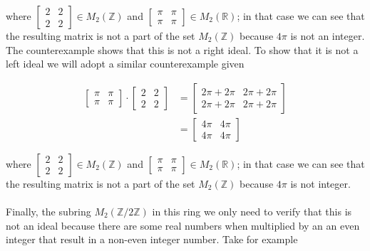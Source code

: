 \documentclass{article}
\begin{document}
        \noindent where $\begin{bmatrix}2 & 2 \\ 2 & 2\end{bmatrix} \in M_2(\mathbb{Z})$ and $\begin{bmatrix}\pi & \pi \\ \pi & \pi\end{bmatrix} \in M_2(\mathbb{R})$; in that case we can see that the resulting matrix is not a part of the set $M_2(\mathbb{Z})$ because $4\pi$ is not an integer. The counterexample shows that this is not a right ideal. To show that it is not a left ideal we will adopt a similar counterexample given

          \[
            \begin{split}
              \begin{bmatrix}\pi & \pi \\ \pi & \pi\end{bmatrix} \cdot \begin{bmatrix}2 & 2 \\ 2 & 2\end{bmatrix}  &= \begin{bmatrix}2\pi + 2\pi & 2\pi + 2\pi \\ 2\pi + 2\pi & 2\pi + 2\pi\end{bmatrix}\\
              &= \begin{bmatrix}4\pi & 4\pi \\ 4\pi & 4\pi \end{bmatrix}
            \end{split}
          \]

        \noindent where $\begin{bmatrix}2 & 2 \\ 2 & 2\end{bmatrix} \in M_2(\mathbb{Z})$ and $\begin{bmatrix}\pi & \pi \\ \pi & \pi\end{bmatrix} \in M_2(\mathbb{R})$; in that case we can see that the resulting matrix is not a part of the set $M_2(\mathbb{Z})$ because $4\pi$ is not integer.

          
        \paragraph{} Finally, the subring $M_2(\mathbb{Z}/2\mathbb{Z})$ in this ring we only need to verify that this is not an ideal because there are some real numbers when multiplied by an an even integer that result in a non-even integer number. Take for example
\end{document}
